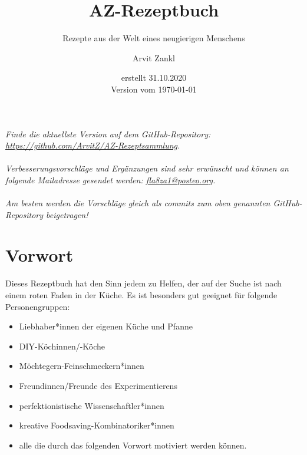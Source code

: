 \documentclass[a4paper, 12pt]{scrbook} 								%
\title{AZ-Rezeptbuch}
\subtitle{Rezepte aus der Welt eines neugierigen Menschens}
\author{Arvit Zankl}
\date{erstellt 31.10.2020  \\\vspace{1cm} Version vom \today}
\numberwithin{equation}{section} 									%
\begin{document}
\maketitle

\newpage

\textit{
Finde die aktuellste Version auf dem GitHub-Repository: \\\href{https://github.com/ArvitZ/AZ-Rezeptsammlung}{https://github.com/ArvitZ/AZ-Rezeptsammlung}. \\\\
Verbesserungsvorschläge und Ergänzungen sind sehr erwünscht und können an folgende Mailadresse gesendet werden: \href{mailto:fla8za1@posteo.org}{fla8za1@posteo.org}. \\\\
Am besten werden die Vorschläge gleich als commits zum oben genannten GitHub-Repository beigetragen!
}

\thispagestyle{empty}	%
\tableofcontents

\newpage
\listoftodos





\chapter{Vorwort}
	\setcounter{page}{1}
	Dieses Rezeptbuch hat den Sinn jedem zu Helfen, der auf der Suche ist nach einem roten Faden in der Küche. Es ist besonders gut geeignet für folgende Personengruppen:
	\begin{itemize}
		\item Liebhaber*innen der eigenen Küche und Pfanne
		\item DIY-Köchinnen/-Köche
		\item Möchtegern-Feinschmeckern*innen
		\item Freundinnen/Freunde des Experimentierens
		\item perfektionistische Wissenschaftler*innen
		\item kreative Foodsaving-Kombinatoriker*innen
		\item alle die durch das folgenden Vorwort motiviert werden können.
	\end{itemize}
\end{document}
